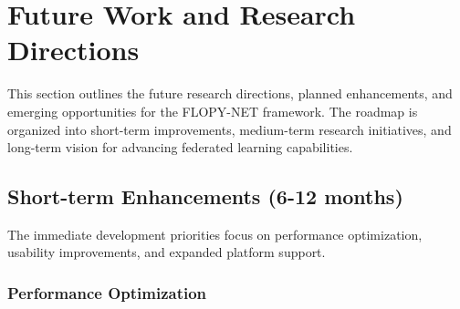 \section{Future Work and Research Directions}
\label{sec:future-work}

This section outlines the future research directions, planned enhancements, and emerging opportunities for the FLOPY-NET framework. The roadmap is organized into short-term improvements, medium-term research initiatives, and long-term vision for advancing federated learning capabilities.

\subsection{Short-term Enhancements (6-12 months)}

The immediate development priorities focus on performance optimization, usability improvements, and expanded platform support.

\subsubsection{Performance Optimization}

